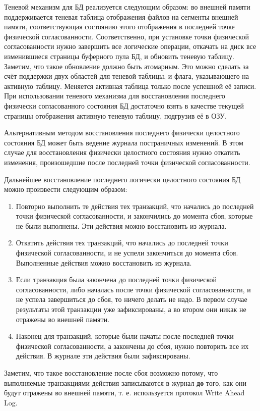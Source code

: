 \documentclass[11pt]{article}
\begin{document}
Теневой механизм для БД реализуется следующим образом: во внешней памяти поддерживается теневая таблица отображения файлов на сегменты внешней памяти, соответствующая состоянию этого отображения в последней точке физической согласованности. Соответственно, при установке точки физической согласованности нужно завершить все логические операции, откачать на диск все изменившиеся страницы буферного пула БД, и обновить теневую таблицу. Заметим, что такое обновление должно быть атомарным. Это можно сделать за счёт поддержки двух областей для теневой таблицы, и флага, указывающего на активную таблицу. Меняется активная таблица только после успешной её записи. При использовании теневого механизма для восстановления последнего физически согласованного состояния БД достаточно взять в качестве текущей страницы отображения активную теневую таблицу, подгрузив её в ОЗУ.

Альтернативным методом восстановления последнего физически целостного состояния БД может быть ведение журнала постраничных изменений. В этом случае для восстановления физически целостного состояния нужно откатить изменения, произошедшие после последней точки физической согласованности.

Дальнейшее восстановление последнего логически целостного состояния БД можно произвести следующим образом:
\begin{enumerate}
\item Повторно выполнить те действия тех транзакций, что начались до последней точки физической согласованности, и закончились до момента сбоя, которые не были выполнены. Эти действия можно восстановить из журнала.
\item Откатить действия тех транзакций, что начались до последней точки физической согласованности, и не успели закончиться до момента сбоя. Выполненные действия можно восстановить из журнала.
\item Если транзакция была закончена до последней точки физической согласованности, либо началась после точки физической согласованности, и не успела завершиться до сбоя, то ничего делать не надо. В первом случае результаты этой транзакции уже зафиксированы, а во втором они никак не отражены во внешней памяти.
\item Наконец для транзакций, которые были начаты после последней точки физической согласованности, а закончены до сбоя, нужно повторить все их действия. В журнале эти действия были зафиксированы.
\end{enumerate}
Заметим, что такое восстановление после сбоя возможно потому, что выполняемые транзакциями действия записываются в журнал \textbf{\textbf{до}} того, как они будут отражены во внешней памяти, т. е. используется протокол Write Ahead Log.
\pagebreak
\end{document}
